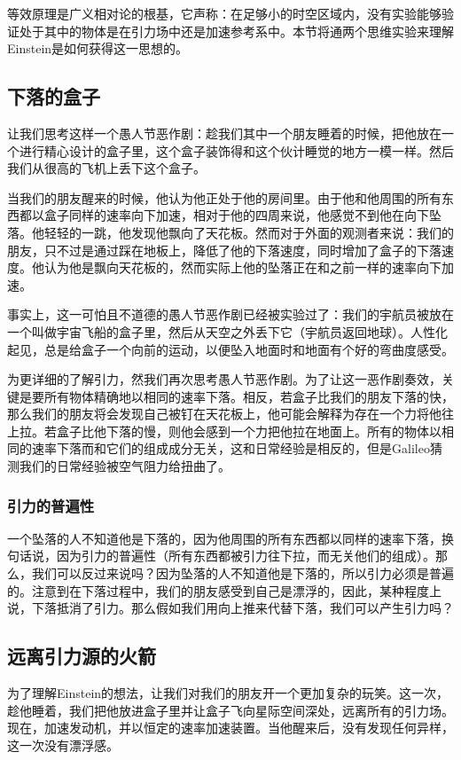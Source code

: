 
等效原理是广义相对论的根基，它声称：在足够小的时空区域内，没有实验能够验证处于其中的物体是在引力场中还是加速参考系中。本节将通两个思维实验来理解Einstein是如何获得这一思想的。

\subsection{下落的盒子}
让我们思考这样一个愚人节恶作剧：趁我们其中一个朋友睡着的时候，把他放在一个进行精心设计的盒子里，这个盒子装饰得和这个伙计睡觉的地方一模一样。然后我们从很高的飞机上丢下这个盒子。

当我们的朋友醒来的时候，他认为他正处于他的房间里。由于他和他周围的所有东西都以盒子同样的速率向下加速，相对于他的四周来说，他感觉不到他在向下坠落。他轻轻的一跳，他发现他飘向了天花板。然而对于外面的观测者来说：我们的朋友，只不过是通过踩在地板上，降低了他的下落速度，同时增加了盒子的下落速度。他认为他是飘向天花板的，然而实际上他的坠落正在和之前一样的速率向下加速。

事实上，这一可怕且不道德的愚人节恶作剧已经被实验过了：我们的宇航员被放在一个叫做宇宙飞船的盒子里，然后从天空之外丢下它（宇航员返回地球）。人性化起见，总是给盒子一个向前的运动，以便坠入地面时和地面有个好的弯曲度感受。

为更详细的了解引力，然我们再次思考愚人节恶作剧。为了让这一恶作剧奏效，关键是要所有物体精确地以相同的速率下落。相反，若盒子比我们的朋友下落的快，那么我们的朋友将会发现自己被钉在天花板上，他可能会解释为存在一个力将他往上拉。若盒子比他下落的慢，则他会感到一个力把他拉在地面上。所有的物体以相同的速率下落而和它们的组成成分无关，这和日常经验是相反的，但是Galileo猜测我们的日常经验被空气阻力给扭曲了。

\subsubsection{引力的普遍性}
一个坠落的人不知道他是下落的，因为他周围的所有东西都以同样的速率下落，换句话说，因为引力的普遍性（所有东西都被引力往下拉，而无关他们的组成）。那么，我们可以反过来说吗？因为坠落的人不知道他是下落的，所以引力必须是普遍的。注意到在下落过程中，我们的朋友感受到自己是漂浮的，因此，某种程度上说，下落抵消了引力。那么假如我们用向上推来代替下落，我们可以产生引力吗？

\subsection{远离引力源的火箭}
为了理解Einstein的想法，让我们对我们的朋友开一个更加复杂的玩笑。这一次，趁他睡着，我们把他放进盒子里并让盒子飞向星际空间深处，远离所有的引力场。现在，加速发动机，并以恒定的速率加速装置。当他醒来后，没有发现任何异样，这一次没有漂浮感。

